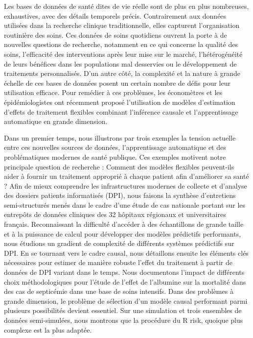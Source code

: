 
Les bases de données de santé dites de vie réelle sont de plus en plus
nombreuses, exhaustives, avec des détails temporels précis. Contrairement aux
données utilisées dans la recherche clinique traditionnelle, elles capturent
l'organisation routinière des soins. Ces données de soins quotidiens ouvrent la
porte à de nouvelles questions de recherche, notamment en ce qui concerne la
qualité des soins, l'efficacité des interventions après leur mise sur le marché,
l'hétérogénéité de leurs bénéfices dans les populations mal desservies ou le
développement de traitements personnalisés. D'un autre côté, la complexité et la
nature à grande échelle de ces bases de données posent un certain nombre de
défis pour leur utilisation efficace. Pour remédier à ces problèmes, les
économètres et les épidémiologistes ont récemment proposé l'utilisation de
modèles d'estimation d'effets de traitement flexibles combinant l'inférence
causale et l'apprentissage automatique en grande dimension.

Dans un premier temps, nous illustrons par trois exemples la tension actuelle
entre ces nouvelles sources de données, l'apprentissage automatique et des
problématiques modernes de santé publique. Ces exemples motivent notre principale question
de recherche : Comment des modèles flexibles peuvent-ils aider à
fournir un traitement approprié à chaque patient afin d'améliorer sa santé ?%
Afin de mieux comprendre les infrastructures modernes de collecte
et d'analyse des dossiers patients informatisés (DPI), nous faisons la
synthèse d'entretiens semi-structurés menés dans le cadre d'une étude de cas
nationale portant sur les entrepôts de données cliniques des 32 hôpitaux
régionaux et universitaires français.%
Reconnaissant la difficulté d'accéder à des échantillons de grande taille et à
la puissance de calcul pour développer des modèles prédictifs performants, nous
étudions un gradient de complexité de différents systèmes prédictifs sur DPI.%
En se tournant vers le cadre causal, nous détaillons ensuite les éléments clés
nécessaires pour estimer de manière robuste l'effet du traitement à partir de
données de DPI variant dans le temps. Nous documentons l'impact de différents
choix méthodologiques pour l'étude de l'effet de l'albumine sur la mortalité
dans des cas de septicémie dans une base de soins intensifs.%
Dans des problèmes à grande dimension, le problème de sélection d'un modèle
causal performant parmi plusieurs possibilités devient essentiel. Sur une
simulation et trois ensembles de données semi-simulées, nous montrons que la
procédure du R risk, quoique plus complexe est la plus adaptée.


